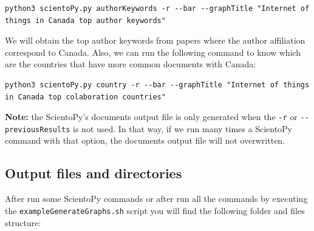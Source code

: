 \documentclass[10pt,letterpaper]{article}
\begin{document}
\begin{verbatim}
python3 scientoPy.py authorKeywords -r --bar --graphTitle "Internet of things in Canada top author keywords" 
\end{verbatim}

We will obtain the top author keywords from papers where the author affiliation correspond to Canada. Also, we can run the following command to know which are the countries that have more common documents with Canada:

\begin{verbatim}
python3 scientoPy.py country -r --bar --graphTitle "Internet of things in Canada top colaboration countries" 
\end{verbatim}

\textbf{Note:} the ScientoPy's documents output file is only generated when the \verb|-r| or \verb|--previousResults| is not used. In that way, if we run many times a ScientoPy command with that option, the documents output file will not overwritten.

\newpage
\subsection{Output files and directories}

After run some ScientoPy commands or after run all the commands by executing the \verb|exampleGenerateGraphs.sh| script you will find the following folder and files structure:

\end{document}
